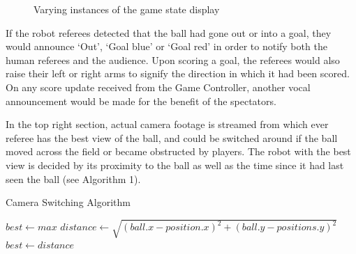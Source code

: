 \documentclass[runningheads,a4paper]{llncs}
\begin{document}
\begin{figure}[h!]
  \centering
  \caption{Varying instances of the game state display\label{display}}
\end{figure}

If the robot referees detected that the ball had gone out or into a goal, they would announce `Out', `Goal blue' or `Goal red' in order to notify both the human referees and the audience.
Upon scoring a goal, the referees would also raise their left or right arms to signify the direction in which it had been scored. 
On any score update received from the Game Controller, another vocal announcement would be made for the benefit of the spectators.

In the top right section, actual camera footage is streamed from which ever referee has the best view of the ball, and could be switched around if the ball moved across the field or became obstructed by players.
The robot with the best view is decided by its proximity to the ball as well as the time since it had last seen the ball (see Algorithm 1).

\begin{algorithm}
\caption{Camera Switching Algorithm}
\begin{algorithmic}

\STATE $best \leftarrow max$
  \STATE $distance \leftarrow \sqrt{(ball.x - position.x)^2 + (ball.y - positions.y)^2}$
        \STATE $best \leftarrow distance$
          \ENDIF
          \ENDFOR

\end{algorithmic}
\end{algorithm}
\end{document}
